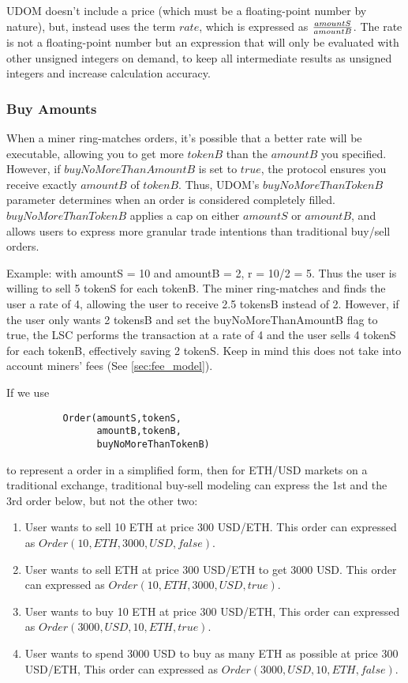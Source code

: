 \documentclass[UTF8,nofonts]{article}
\begin{document}
\begin{multicols}{2}
UDOM doesn't include a price (which must be a floating-point number by nature), but, instead uses the term $rate$, which is expressed as $amountS \over amountB$. The rate is not a floating-point number but an expression that will only be evaluated with other unsigned integers on demand, to keep all intermediate results as unsigned integers and increase calculation accuracy. 

\subsubsection{Buy Amounts}
When a miner ring-matches orders, it's possible that a better rate will be executable, allowing you to get more $tokenB$ than the $amountB$ you specified. However, if $buyNoMoreThanAmountB$ is set to $true$, the protocol ensures you receive exactly $amountB$ of $tokenB$. Thus, UDOM's $buyNoMoreThanTokenB$ parameter determines when an order is considered completely filled. $buyNoMoreThanTokenB$ applies a cap on either $amountS$ or $amountB$, and allows users to express more granular trade intentions than traditional buy/sell orders.

Example: with amountS = 10 and amountB = 2, r = 10/2 = 5. Thus the user is willing to sell 5 tokenS for each tokenB. The miner ring-matches and finds the user a rate of 4, allowing the user to receive 2.5 tokensB instead of 2. However, if the user only wants 2 tokensB and set the buyNoMoreThanAmountB flag to true, the LSC performs the transaction at a rate of 4 and the user sells 4 tokenS for each tokenB, effectively saving 2 tokenS. Keep in mind this does not take into account miners' fees (See \ref{sec:fee_model}).

If we use

\begin{verbatim}
	      Order(amountS,tokenS,
	            amountB,tokenB,
	            buyNoMoreThanTokenB)
\end{verbatim}

to represent a order in a simplified form, then for ETH/USD markets on a traditional exchange, traditional buy-sell modeling can express the 1st and the 3rd order below, but not the other two:

\begin{enumerate}
	\item User wants to sell 10 ETH at price 300 USD/ETH. This order can expressed as $Order(10, ETH, 3000, USD, false)$.
	\item User wants to sell ETH at price 300 USD/ETH to get 3000 USD. This order can expressed as $Order(10, ETH, 3000, USD, true)$.
	\item User wants to buy 10 ETH at price 300 USD/ETH, This order can expressed as $Order(3000, USD, 10, ETH, true)$.
	\item User wants to spend 3000 USD to buy as many ETH as possible at price 300 USD/ETH, This order can expressed as $Order(3000, USD, 10, ETH, false)$.
\end{enumerate}






\end{multicols}
\end{document}
